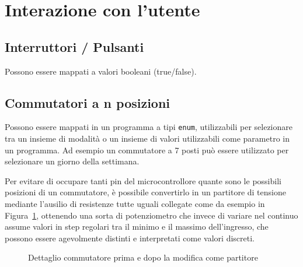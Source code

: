 \documentclass[12pt,a4paper]{report}
\begin{document}
\section{Interazione con l'utente}

\subsection{Interruttori / Pulsanti}
Possono essere mappati a valori booleani (true/false).

\subsection{Commutatori a n posizioni}
Possono essere mappati in un programma a tipi \texttt{enum}, utilizzabili per selezionare tra un insieme di modalità o un insieme di valori
utilizzabili come parametro in un programma. Ad esempio un commutatore a 7 posti può essere utilizzato per selezionare un giorno della
settimana.

Per evitare di occupare tanti pin del microcontrollore quante sono le possibili posizioni di un commutatore, è possibile convertirlo in un
partitore di tensione mediante l'ausilio di resistenze tutte uguali collegate come da esempio in Figura~\ref{fig:commutatoreprimadopo},
ottenendo una sorta di potenziometro che invece di variare nel continuo assume valori in step regolari tra il minimo e il massimo
dell'ingresso, che possono essere agevolmente distinti e interpretati come valori discreti.

\begin{figure}[h]
  \centering
  \enspace
  \caption{Dettaglio commutatore prima e dopo la modifica come partitore}
  \label{fig:commutatoreprimadopo}
\end{figure}
\end{document}

